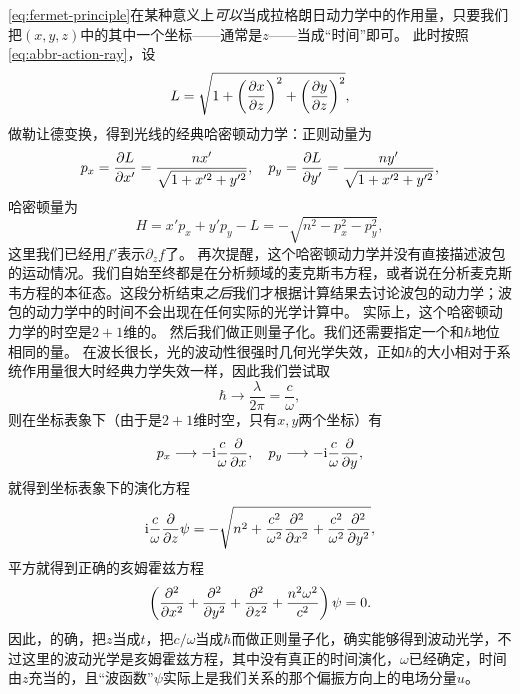 \eqref{eq:fermet-principle}在某种意义上\emph{可以}当成拉格朗日动力学中的作用量，只要我们把$(x, y, z)$中的其中一个坐标——通常是$z$——当成“时间”即可。
此时按照\eqref{eq:abbr-action-ray}，设
\begin{equation}
    L = \sqrt{1 + \left(\pdv{x}{z}\right)^2 + \left(\pdv{y}{z}\right)^2},
\end{equation}
做勒让德变换，得到光线的经典哈密顿动力学：正则动量为
\begin{equation}
    p_x = \pdv{L}{x'} = \frac{n x'}{\sqrt{1 + x'^2 + y'^2}}, \quad p_y = \pdv{L}{y'} = \frac{n y'}{\sqrt{1 + x'^2 + y'^2}},
\end{equation}
哈密顿量为
\begin{equation}
    H = x' p_x + y' p_y - L = - \sqrt{n^2 - p_x^2 - p_y^2} ,
\end{equation}
这里我们已经用$f'$表示$\partial_z f$了。
再次提醒，这个哈密顿动力学并没有直接描述波包的运动情况。我们自始至终都是在分析频域的麦克斯韦方程，或者说在分析麦克斯韦方程的本征态。这段分析结束\emph{之后}我们才根据计算结果去讨论波包的动力学；波包的动力学中的时间不会出现在任何实际的光学计算中。
实际上，这个哈密顿动力学的时空是$2+1$维的。
然后我们做正则量子化。我们还需要指定一个和$\hbar$地位相同的量。
在波长很长，光的波动性很强时几何光学失效，正如$\hbar$的大小相对于系统作用量很大时经典力学失效一样，因此我们尝试取
\begin{equation}
    \hbar \longrightarrow \frac{\lambda}{2 \pi} = \frac{c}{\omega},
\end{equation}
则在坐标表象下（由于是$2+1$维时空，只有$x, y$两个坐标）有
\begin{equation}
    p_x \longrightarrow - \mathrm{i} \frac{c}{\omega} \pdv{x}, \quad p_y \longrightarrow - \mathrm{i} \frac{c}{\omega} \pdv{y},
\end{equation}
就得到坐标表象下的演化方程
\[
    \mathrm{i} \frac{c}{\omega} \pdv{z} \psi = - \sqrt{n^2 + \frac{c^2}{\omega^2} \pdv[2]{x} + \frac{c^2}{\omega^2} \pdv[2]{y}},
\]
平方就得到正确的亥姆霍兹方程
\[
    \left( \pdv[2]{x} + \pdv[2]{y} + \pdv[2]{z} + \frac{n^2 \omega^2}{c^2} \right) \psi = 0.
\]
因此，的确，把$z$当成$t$，把$c/\omega$当成$\hbar$而做正则量子化，确实能够得到波动光学，不过这里的波动光学是亥姆霍兹方程，其中没有真正的时间演化，$\omega$已经确定，时间由$z$充当的，且“波函数”$\psi$实际上是我们关系的那个偏振方向上的电场分量$u$。

